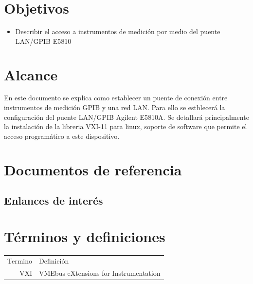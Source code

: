 \documentclass[paper=letter,oneside,fontsize=11pt, parskip=full]{scrartcl}
\newenvironment{link}
	{\ttfamily}{}
\begin{document}
	
	\clearpage
	
	\tableofcontents
	
	\section{Objetivos}
		\begin{itemize}
			\item Describir el acceso a instrumentos de medición por medio del puente LAN/GPIB E5810
		
		\end{itemize}
		
	\section{Alcance}
	
		En este documento se explica como establecer un puente de conexión entre instrumentos de medición GPIB y una red LAN. Para ello se estblecerá la configuración del puente LAN/GPIB Agilent E5810A. Se detallará principalmente la instalación de la libreria VXI-11 para linux, soporte de software que permite el acceso programático a este dispositivo.	
		
	\section{Documentos de referencia}
	
		\subsection{Enlances de interés}

	
			\begin{link}

			\end{link}	
	

	
	\section{Términos y definiciones}
	
		\begin{tabular}{rl}
			Termino 	& 	Definición \\	
			VXI			& 	VMEbus eXtensions for Instrumentation \\
		\end{tabular}
	
\end{document}
